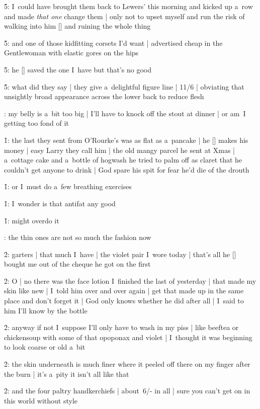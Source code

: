 \f5:
I~could have brought them back to Lewers' this morning and kicked up a~row
and made \emph{that one} change them |
only not to upset myself and run the risk of walking into him [\boylan]
and ruining the whole thing

\f5:
and one of those kidfitting corsets I'd want |
advertised cheap in the Gentlewoman with elastic gores on the hips

\f5:
he [\bloom] saved the one I~have but that's no good

\f5:
what did they say |
they give a~delightful figure line |
11/6 |
obviating that unsightly broad appearance across the lower back to reduce flesh

:
my belly is a~bit too big |
I'll have to knock off the stout at dinner |
or am~I getting too fond of it

\f1:
the last they sent from O'Rourke's was as flat as a~pancake |
he [\orourke] makes his money |
easy Larry they call him |
the old mangy parcel he sent at Xmas |
a~cottage cake and a~bottle of hogwash he tried to palm off as claret
that he couldn't get anyone to drink |
God spare his spit for fear he'd die of the drouth

\f1:
or I~must do a~few breathing exercises

\f1:
I~wonder is that antifat any good

\f1:
might overdo it

:
the thin ones are not so much the fashion now

\f2:
garters |
that much I~have |
the violet pair I~wore today |
that's all he [\bloom] bought me out of the cheque he got on the first

\f2:
O |
no there was the face lotion I~finished the last of yesterday |
that made my skin like new |
I~told him over and over again |
get that made up in the same place and don't forget it |
God only knows whether he did after all |
I~said to him I'll know by the bottle

\f2:
anyway if not I~suppose I'll only have to wash in my piss |
like beeftea or chickensoup with some of that opoponax and violet |
I~thought it was beginning to look coarse or old a~bit

\f2:
the skin underneath is much finer where it peeled off there on my finger after the burn |
it's a~pity it isn't all like that

\f2:
and the four paltry handkerchiefs |
about~6/- in all |
sure you can't get on in this world without style

